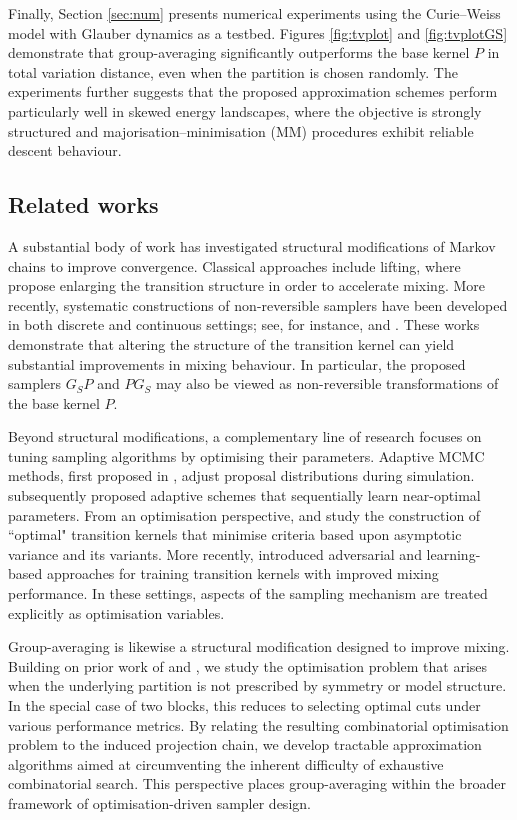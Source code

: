 \documentclass[EJP]{ejpecp} %
\begin{document}
Finally, Section \ref{sec:num} presents numerical experiments using the Curie–Weiss model with Glauber dynamics as a testbed. Figures \ref{fig:tvplot} and \ref{fig:tvplotGS} demonstrate that group-averaging significantly outperforms the base kernel $P$ in total variation distance, even when the partition is chosen randomly. The experiments further suggests that the proposed approximation schemes perform particularly well in skewed energy landscapes, where the objective is strongly structured and majorisation–minimisation (MM) procedures exhibit reliable descent behaviour.

\subsection{Related works}
A substantial body of work has investigated structural modifications of Markov chains to improve convergence. Classical approaches include lifting, where \cite{chen_lifting} propose enlarging the transition structure in order to accelerate mixing. More recently, systematic constructions of non-reversible samplers have been developed in both discrete and continuous settings; see, for instance, \cite{TURITSYN2011410} and \cite{bierkens_2016}. These works demonstrate that altering the structure of the transition kernel can yield substantial improvements in mixing behaviour. In particular, the proposed samplers $G_SP$ and $PG_S$ may also be viewed as non-reversible transformations of the base kernel $P$.

Beyond structural modifications, a complementary line of research focuses on tuning sampling algorithms by optimising their parameters. Adaptive MCMC methods, first proposed in \cite{haario_adaptive}, adjust proposal distributions during simulation. \cite{atchade_2005} subsequently proposed adaptive schemes that sequentially learn near-optimal parameters. From an optimisation perspective, \cite{chen_2012} and \cite{huang_2018} study the construction of ``optimal" transition kernels that minimise criteria based upon asymptotic variance and its variants. More recently, \cite{pmlr-v235-egorov24a} introduced adversarial and learning-based approaches for training transition kernels with improved mixing performance. In these settings, aspects of the sampling mechanism are treated explicitly as optimisation variables.

Group-averaging is likewise a structural modification designed to improve mixing. Building on prior work of \cite{choi2025groupaveragedmarkovchainsmixing} and \cite{GPG}, we study the optimisation problem that arises when the underlying partition is not prescribed by symmetry or model structure. In the special case of two blocks, this reduces to selecting optimal cuts under various performance metrics. By relating the resulting combinatorial optimisation problem to the induced projection chain, we develop tractable approximation algorithms aimed at circumventing the inherent difficulty of exhaustive combinatorial search. This perspective places group-averaging within the broader framework of optimisation-driven sampler design.
\end{document}
